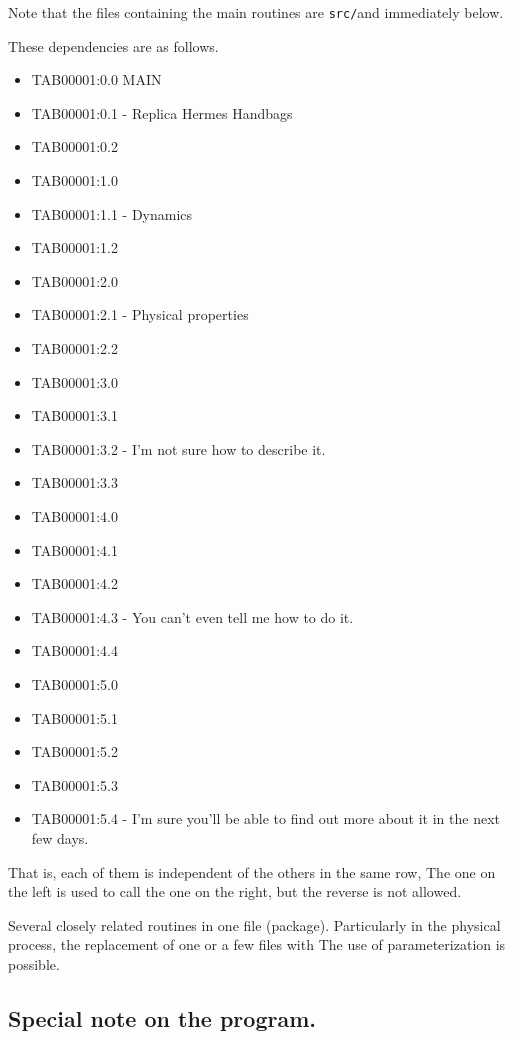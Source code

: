 Note that the files containing the main routines are {\texttt{src/}}and
immediately below.

These dependencies are as follows.

\begin{itemize}
\item
  TAB00001:0.0 MAIN
\item
  TAB00001:0.1 - Replica Hermes Handbags
\item
  TAB00001:0.2
\item
  TAB00001:1.0
\item
  TAB00001:1.1 - Dynamics
\item
  TAB00001:1.2
\item
  TAB00001:2.0
\item
  TAB00001:2.1 - Physical properties
\item
  TAB00001:2.2
\item
  TAB00001:3.0
\item
  TAB00001:3.1
\item
  TAB00001:3.2 - I'm not sure how to describe it.
\item
  TAB00001:3.3
\item
  TAB00001:4.0
\item
  TAB00001:4.1
\item
  TAB00001:4.2
\item
  TAB00001:4.3 - You can't even tell me how to do it.
\item
  TAB00001:4.4
\item
  TAB00001:5.0
\item
  TAB00001:5.1
\item
  TAB00001:5.2
\item
  TAB00001:5.3
\item
  TAB00001:5.4 - I'm sure you'll be able to find out more about it in
  the next few days.
\end{itemize}

That is, each of them is independent of the others in the same row, The
one on the left is used to call the one on the right, but the reverse is
not allowed.

Several closely related routines in one file (package). Particularly in
the physical process, the replacement of one or a few files with The use
of parameterization is possible.

\hypertarget{special-note-on-the-program.}{%
\subsection{Special note on the
program.}\label{special-note-on-the-program.}}

